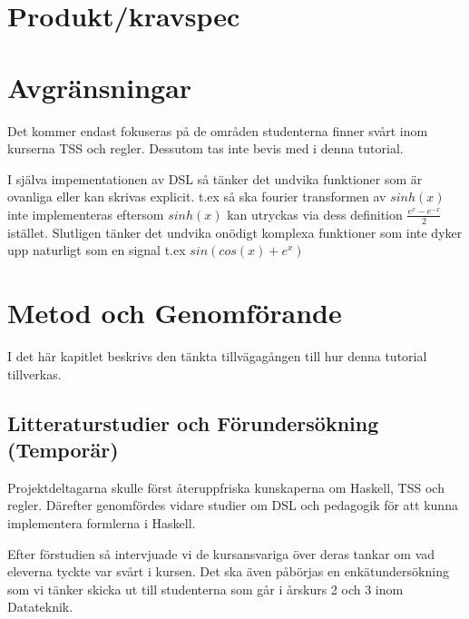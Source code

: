 \documentclass[]{article}
\begin{document}
\section{Produkt/kravspec}

\section{Avgränsningar}

%

Det kommer endast fokuseras på de områden studenterna finner svårt inom
kurserna TSS och regler. Dessutom tas inte bevis med i denna tutorial.

I själva impementationen av DSL så tänker det undvika funktioner som är
ovanliga eller kan skrivas explicit. t.ex så ska fourier transformen av
$sinh(x)$ inte implementeras eftersom $sinh(x)$ kan utryckas via dess
definition $\frac{e^{x} - e^{-x}}{2}$ istället.
Slutligen tänker det undvika onödigt komplexa funktioner som inte
dyker upp naturligt som en signal t.ex $sin(cos(x)+e^x)$

\section{Metod och Genomförande}


I det här kapitlet beskrivs den tänkta tillvägagången till hur denna
tutorial tillverkas.

\subsection{Litteraturstudier och Förundersökning (Temporär)}


Projektdeltagarna skulle först återuppfriska kunskaperna om Haskell, TSS
och regler. Därefter genomfördes vidare studier om DSL och pedagogik för
att kunna implementera formlerna i Haskell.

Efter förstudien så intervjuade vi de kursansvariga över deras tankar om vad
eleverna tyckte var svårt i kursen. Det ska även påbörjas en enkätundersökning
som vi tänker skicka ut till studenterna som går i årskurs 2 och 3 inom Datateknik.  
\end{document}
